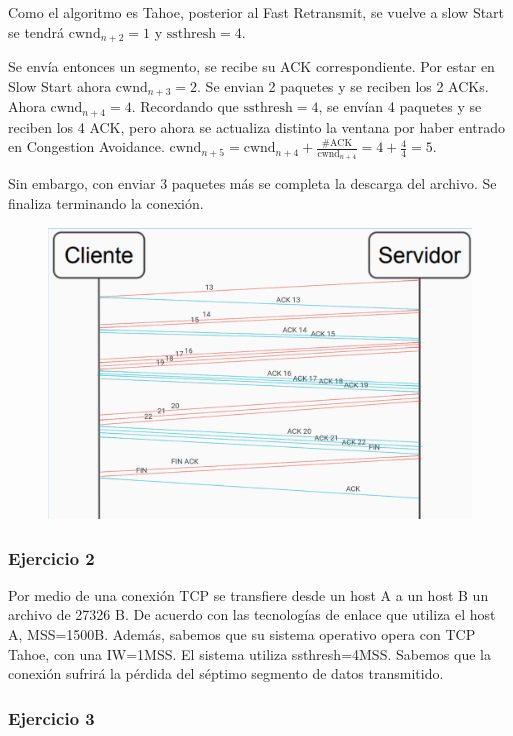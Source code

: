 \documentclass[titlepage,a4paper]{article}
\begin{document}
Como el algoritmo es Tahoe, posterior al Fast Retransmit, se vuelve a slow Start se tendrá $ \mathrm{cwnd}_{n+2} = 1 $ y   $\mathrm{ssthresh}= 4 $.

Se envía entonces un segmento, se recibe su ACK correspondiente. Por estar en Slow Start ahora  $ \mathrm{cwnd}_{n+3} = 2 $. Se envian 2 paquetes y se reciben los 2 ACKs. Ahora $ \mathrm{cwnd}_{n+4} = 4 $. Recordando que   $\mathrm{ssthresh}= 4 $, se envían 4 paquetes y se reciben los 4 ACK, pero ahora se actualiza distinto la ventana por haber entrado en Congestion Avoidance. $ \mathrm{cwnd}_{n+5} = \mathrm{cwnd}_{n+4} + \frac{\#\mathrm{ACK}}{\mathrm{cwnd}_{n+4}} = 4 + \frac{4}{4} = 5 $. 

Sin embargo, con enviar 3 paquetes más se completa la descarga del archivo. Se finaliza terminando la conexión.

\begin{figure}[H]
\centering
\includegraphics[width=\textwidth]{imagenes/resEj13.png}
\end{figure}

\subsubsection{Ejercicio 2}
Por medio de una conexión TCP se transfiere desde un host A a un host B un archivo de 27326 B. De acuerdo con las tecnologías de enlace que utiliza el host A, MSS=1500B. Además, sabemos que su sistema operativo opera con TCP Tahoe, con una IW=1MSS. El sistema utiliza ssthresh=4MSS. Sabemos que la conexión sufrirá la pérdida del séptimo segmento de datos transmitido.

\subsubsection{Ejercicio 3}
\end{document}
